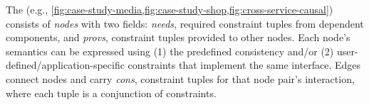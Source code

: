 The \sysgraph{} (e.g., \cref{fig:case-study-media,fig:case-study-shop,fig:cross-service-causal}) 
consists of \textit{nodes} with two fields:
\textit{needs}, required constraint tuples from dependent components, and
\textit{provs}, constraint tuples provided to other nodes.
Each node's semantics can be expressed using (1) the predefined consistency \sysmods{}
and/or (2) user-defined/application-specific constraints that implement the same interface. Edges connect nodes
and carry \textit{cons}, constraint tuples for that node pair's interaction, where
each tuple is a conjunction of constraints. 


\usetikzlibrary{arrows.meta, positioning, calc, fit}

